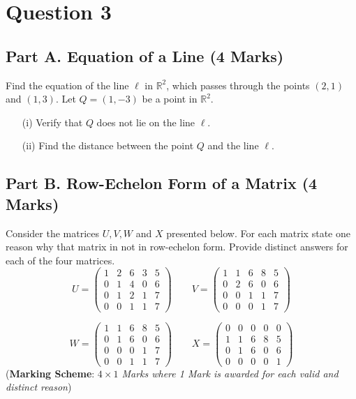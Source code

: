 \documentclass[12pt,a4paper]{article}
\begin{document}
\section*{Question 3}



\subsection*{Part A. Equation of a Line (4 Marks)}
Find the equation of the line $\ell$ in $\mathbb{R}^2$, which  passes through the points $(2,1)$ and $(1,3)$. Let $Q = (1, -3)$  be a point in $\mathbb{R}^2$.
	\begin{itemize}
		\item[(i)] Verify that $Q$ does not lie on the line $\ell$.
		
		\item[(ii)] Find the distance between the point $Q$ and the line $\ell$.
	\end{itemize}



\subsection*{Part B. Row-Echelon Form of a Matrix (4 Marks)}
Consider the matrices $U,V,W$ and $X$ presented below. For each matrix state one reason why that matrix in not in row-echelon form. Provide distinct answers for each of the four matrices.
\[
U = \begin{pmatrix}
	1&2 & 6  &3 & 5
	\\  0&1&4 &0 & 6
	\\  0&1&2 &1 & 7
	\\  0&0&1 &1 & 7
	\end{pmatrix} \qquad  V = \begin{pmatrix}
	1&1 & 6  &8 & 5
	\\  0&2&6 &0 & 6
	\\  0&0&1 &1 & 7
	\\  0&0&0 &1 & 7
	\end{pmatrix}
\]

\[
W = \begin{pmatrix}
	1&1 & 6  &8 & 5
	\\  0&1&6 &0 & 6
	\\  0&0&0 &1 & 7
	\\  0&0&1 &1 & 7
	\end{pmatrix} \qquad X = \begin{pmatrix}
			0&0&0 &0 & 0\\
	1&1 & 6  &8 & 5
	\\  0&1&6 &0 & 6
	\\  0&0&0 &0 & 1

	\end{pmatrix}
\]
\smallskip
\noindent (\textbf{Marking Scheme}: \textit{$4 \times 1$ Marks where 1 Mark is awarded for each valid and distinct reason})
\end{document}
